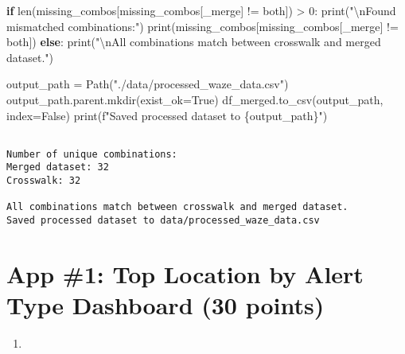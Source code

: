 \documentclass[
  letterpaper,
  DIV=11,
  numbers=noendperiod]{scrartcl}
\newenvironment{Shaded}{\begin{snugshade}}{\end{snugshade}}
\newcommand{\BuiltInTok}[1]{\textcolor[rgb]{0.00,0.23,0.31}{#1}}
\newcommand{\CharTok}[1]{\textcolor[rgb]{0.13,0.47,0.30}{#1}}
\newcommand{\ControlFlowTok}[1]{\textcolor[rgb]{0.00,0.23,0.31}{\textbf{#1}}}
\newcommand{\DecValTok}[1]{\textcolor[rgb]{0.68,0.00,0.00}{#1}}
\newcommand{\NormalTok}[1]{\textcolor[rgb]{0.00,0.23,0.31}{#1}}
\newcommand{\OperatorTok}[1]{\textcolor[rgb]{0.37,0.37,0.37}{#1}}
\newcommand{\SpecialCharTok}[1]{\textcolor[rgb]{0.37,0.37,0.37}{#1}}
\newcommand{\SpecialStringTok}[1]{\textcolor[rgb]{0.13,0.47,0.30}{#1}}
\newcommand{\StringTok}[1]{\textcolor[rgb]{0.13,0.47,0.30}{#1}}
\newcommand{\VariableTok}[1]{\textcolor[rgb]{0.07,0.07,0.07}{#1}}
\providecommand{\tightlist}{%
  \setlength{\itemsep}{0pt}\setlength{\parskip}{0pt}}\usepackage{longtable,booktabs,array}
\begin{document}
\begin{Shaded}
\begin{Highlighting}[]
\ControlFlowTok{if} \BuiltInTok{len}\NormalTok{(missing\_combos[missing\_combos[}\StringTok{\textquotesingle{}\_merge\textquotesingle{}}\NormalTok{] }\OperatorTok{!=} \StringTok{\textquotesingle{}both\textquotesingle{}}\NormalTok{]) }\OperatorTok{\textgreater{}} \DecValTok{0}\NormalTok{:}
    \BuiltInTok{print}\NormalTok{(}\StringTok{"}\CharTok{\textbackslash{}n}\StringTok{Found mismatched combinations:"}\NormalTok{)}
    \BuiltInTok{print}\NormalTok{(missing\_combos[missing\_combos[}\StringTok{\textquotesingle{}\_merge\textquotesingle{}}\NormalTok{] }\OperatorTok{!=} \StringTok{\textquotesingle{}both\textquotesingle{}}\NormalTok{])}
\ControlFlowTok{else}\NormalTok{:}
    \BuiltInTok{print}\NormalTok{(}\StringTok{"}\CharTok{\textbackslash{}n}\StringTok{All combinations match between crosswalk and merged dataset."}\NormalTok{)}

\NormalTok{output\_path }\OperatorTok{=}\NormalTok{ Path(}\StringTok{"./data/processed\_waze\_data.csv"}\NormalTok{)}
\NormalTok{output\_path.parent.mkdir(exist\_ok}\OperatorTok{=}\VariableTok{True}\NormalTok{)  }
\NormalTok{df\_merged.to\_csv(output\_path, index}\OperatorTok{=}\VariableTok{False}\NormalTok{)}
\BuiltInTok{print}\NormalTok{(}\SpecialStringTok{f"Saved processed dataset to }\SpecialCharTok{\{}\NormalTok{output\_path}\SpecialCharTok{\}}\SpecialStringTok{"}\NormalTok{)}
\end{Highlighting}
\end{Shaded}

\begin{verbatim}

Number of unique combinations:
Merged dataset: 32
Crosswalk: 32

All combinations match between crosswalk and merged dataset.
Saved processed dataset to data/processed_waze_data.csv
\end{verbatim}

\section*{App \#1: Top Location by Alert Type Dashboard (30
points)}\label{app-1-top-location-by-alert-type-dashboard-30-points}

\begin{enumerate}
\def\labelenumi{\arabic{enumi}.}
\tightlist
\item
\end{enumerate}
\end{document}
